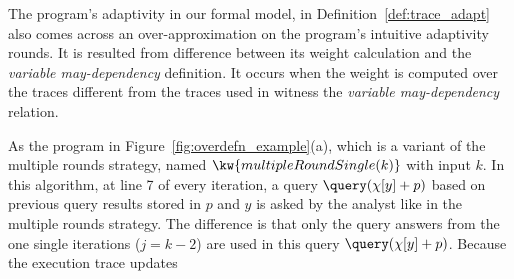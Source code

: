 \begin{example}
    \label{ex:multipleRoundSingle}
    The program's adaptivity in our formal model,
    in Definition~\ref{def:trace_adapt} also
     comes across an over-approximation on the program's
     intuitive adaptivity rounds.
    It is resulted from difference between its weight calculation and the \emph{variable may-dependency} definition.
    It occurs when the weight is computed over the traces different from the traces used in 
    witness the \emph{variable may-dependency} relation.
    
    As the program in Figure~\ref{fig:overdefn_example}(a),
    which is a variant of the multiple rounds strategy, 
    named $\kw{multipleRoundSingle(k)}$ with input $k$.
    In this algorithm, 
    at line 7 of every iteration, 
    a query $\query(\chi[y] + p)$ based on previous query results stored in $p$ and $y$ is asked by the analyst like in the multiple rounds strategy. 
    The difference is that only the query answers from the one single iterations ($j = k - 2 $) are 
    used in this query $\query(\chi[y] + p)$.
    Because the execution trace updates 

\end{example}
